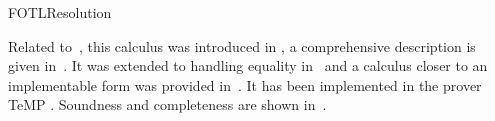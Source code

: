 \begin{entry}{FOTLResolution}
\begin{history}
Related to~, this calculus was introduced in
\cite{Degtyarev+Fisher+Konev@CADE2003},
a comprehensive description is given
in~\cite{DBLP:journals/tocl/DegtyarevFK06}. It was 
extended to handling equality in~\cite{Konev+Degtyarev+Fisher@LPAR2003} 
and a calculus closer to an implementable form was provided 
in~\cite{KDDFH05}. It has been implemented in the prover TeMP
\cite{DBLP:conf/cade/HustadtKRV04}.
Soundness and completeness 
are shown 
in~\cite{DBLP:journals/tocl/DegtyarevFK06}. 
\end{history}




%
%
%
%
%
%
% 
%




\end{entry}
